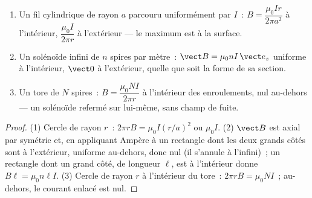 \begin{proposition}\label{prop:b1:magnetostatics:ampereapps}
\begin{enumerate}
  \item Un fil cylindrique de rayon $a$ parcouru uniformément par $I$~:
        $B = \dfrac{\mu_0Ir}{2\pi a^2}$ à l'intérieur, $\dfrac{\mu_0I}{2\pi r}$ à l'extérieur
        --- le maximum est à la surface.
  \item Un solénoïde infini de $n$ spires par mètre~: $\vect B = \mu_0nI\,
        \vect e_z$ uniforme à l'intérieur, $\vect 0$ à l'extérieur, quelle que
        soit la forme de sa section.
  \item Un tore de $N$ spires~: $B = \dfrac{\mu_0NI}{2\pi r}$ à l'intérieur des
        enroulements, nul au-dehors --- un solénoïde refermé sur lui-même,
        sans champ de fuite.
\end{enumerate}
\end{proposition}

\begin{proof}
(1) Cercle de rayon $r$~: $2\pi rB = \mu_0I(r/a)^2$ ou $\mu_0I$. (2) $\vect B$
est axial par symétrie et, en appliquant Ampère à un rectangle dont les deux
grands côtés sont à l'extérieur, uniforme au-dehors, donc nul (il s'annule à
l'infini)~; un rectangle dont un grand côté, de longueur $\ell$, est à
l'intérieur donne $B\ell =
\mu_0n\ell I$. (3) Cercle de rayon $r$ à l'intérieur du tore~: $2\pi rB =
\mu_0NI$~; au-dehors, le courant enlacé est nul.
\end{proof}

